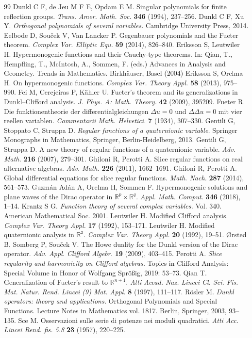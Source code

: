 \documentclass{amsart}
\theoremstyle{definition}
\theoremstyle{remark}
\numberwithin{equation}{section}
\begin{document}
\begin{thebibliography}{99}
 Dunkl C F, de Jeu M F E, Opdam E M. Singular polynomials for finite reflection groups. {\em Trans. Amer. Math. Soc.} {\bf 346} (1994), 237--256.
 Dunkl C F, Xu Y. {\em Orthogonal polynomials of several variables.} Cambridge University Press, 2014.
 Eelbode D, Sou\v{c}ek V, Van Lancker P. Gegenbauer polynomials and the Fueter theorem. {\em Complex Var. Elliptic Equ.} {\bf 59} (2014),  826--840.
 Eriksson S, Leutwiler H. Hypermonogenic functions and their Cauchy-type theorems. In: Qian, T., Hempfling, T., McIntosh, A., Sommen, F. (eds.) Advances in Analysis and Geometry. Trends in Mathematics. Birkh\"auser, Basel (2004)
 Eriksson S, Orelma H. On hypermonogenic functions. {\em Complex Var. Theory Appl.}  {\bf 58} (2013),  975--990.
 Fei M, Cerejeiras P, K\"ahler U. Fueter's theorem and its generalizations in Dunkl–Clifford analysis. {\em J. Phys. A:  Math.  Theory.} {\bf 42} (2009),  395209.
  Fueter R. Die funktionentheorie der differentialgleichungen $\Delta u = 0$ und
$\Delta \Delta u = 0$ mit vier reellen variablen. {\em Commentarii Math. Helvetici.} {\bf 7} (1934), 307--330.
 Gentili G, Stoppato C, Struppa D. {\em Regular functions of a quaternionic variable.} Springer Monographs in Mathematics, Springer, Berlin-Heidelberg, 2013.
 Gentili G,  Struppa D. A new theory of regular functions of a quaternionic variable. {\em  Adv. Math.} {\bf 216} (2007), 279--301.
Ghiloni R, Perotti A. Slice regular functions on real alternative algebras. {\em Adv. Math.} {\bf 226} (2011), 1662--1691.
 Ghiloni R, Perotti A. Global differential equations for slice regular functions.  {\em Math. Nach.}
{\bf 287} (2014), 561--573.
 Guzm\'an Ad\'an A, Orelma H, Sommen F. Hypermonogenic solutions and plane waves of the Dirac
operator in $\mathbb{R}^{p}\times \mathbb{R}^{q}$. {\em Appl. Math. Comput.} {\bf 346} (2018), 1--14.
 Krantz S G. {\em Function theory of several complex variables.} Vol. 340. American Mathematical Soc. 2001.
 Leutwiler H. Modified Clifford analysis. {\em Complex Var. Theory Appl.} {\bf 17} (1992), 153--171.
 Leutwiler H. Modified quaternionic analysis in $\mathbb{R}^3$. {\em Complex Var. Theory Appl.}
{\bf 20} (1992), 19--51.
 {\O}rsted B, Somberg P, Sou\v{c}ek V. The Howe duality for the Dunkl version of the Dirac operator. {\em Adv. Appl. Clifford Algebr.} {\bf 19} (2009),  403--415.
 Perotti A. {\em Slice regularity and harmonicity on Clifford algebras.} Topics in Clifford Analysis: Special Volume in Honor of Wolfgang Spr\"o\ss ig, 2019: 53--73.
 Qian T. Generalization of Fueter’s result to $\mathbb{R}^{n+1}$. {\em Atti Accad. Naz. Lincei Cl.
Sci. Fis. Mat. Natur. Rend. Lincei (9) Mat. Appl.} {\bf 8} (1997),  111--117.
 R\"osler M. {\em Dunkl operators: theory and applications.} Orthogonal Polynomials and Special Functions.
Lecture Notes in Mathematics vol. 1817. Berlin, Springer, 2003,  93--135.
 Sce M. Osservazioni sulle serie di potenze nei moduli quadratici. {\em Atti Acc. Lincei Rend. fis. 5.8} {\bf 23} (1957), 220–225.




\end{thebibliography}
\end{document}
